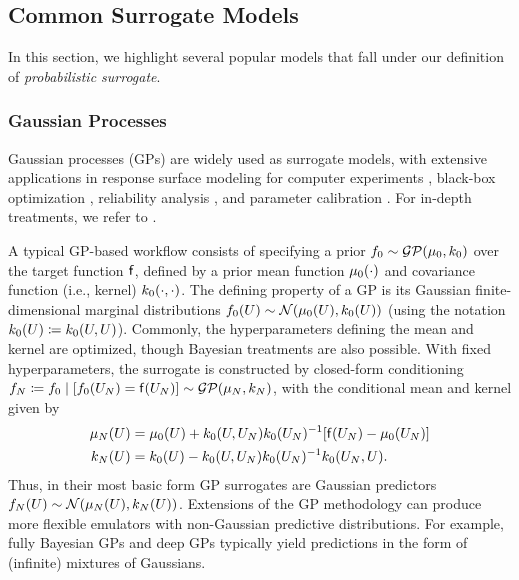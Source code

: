 \documentclass[12pt]{article}
\begin{document}
\subsection{Common Surrogate Models}
In this section, we highlight several popular models that fall under our definition of 
\textit{probabilistic surrogate}.

\subsubsection{Gaussian Processes}
Gaussian processes (GPs) are widely used as surrogate models, with extensive applications in 
response surface modeling for computer experiments 
\citep{design_analysis_computer_experiments,SanterCompExp}, 
black-box optimization \citep{reviewBayesOpt}, reliability 
analysis \citep{contourEstimation,cole2021entropybased}, and parameter 
calibration \citep{KOH,computerModelCalibrationReview}. For in-depth treatments, we refer to
\citet{gramacy2020surrogates,gpML,StuartTeck2}.

A typical GP-based workflow consists of specifying a prior $\targetEm[0] \sim \GP(\emMean[0], \emKer[0])$ 
over the target function $\target$, defined by a prior mean function $\emMean[0](\cdot)$ and 
covariance function (i.e., kernel) $\emKer[0](\cdot, \cdot)$. The 
defining property of a GP is its Gaussian finite-dimensional marginal distributions
$\targetEm[0](\ParBatch) \sim \Gaussian(\emMean[0](\ParBatch), \emKer[0](\ParBatch))$
(using the notation $\emKer[0](\ParBatch) \Def \emKer[0](\ParBatch, \ParBatch)$).
Commonly, the hyperparameters defining the mean and kernel are optimized, though Bayesian 
treatments are also possible. With fixed hyperparameters, the surrogate is constructed by 
closed-form conditioning 
$\targetEm \Def \targetEm[0] \given [\targetEm[0](\design) = \target(\design)] \sim \GP(\emMean, \emKer)$,
with the conditional mean and kernel given by
\begin{align}
\emMean(\ParBatch) 
&= \emMean[0](\ParBatch) + \emKer[0](\ParBatch, \design) \emKer[0](\design)^{-1}[\target(\design) - \emMean[0](\design)] \\
\emKer(\ParBatch) 
&= \emKer[0](\ParBatch) - \emKer[0](\ParBatch, \design) \emKer[0](\design)^{-1} \emKer[0](\design, \ParBatch).
\nonumber
\end{align}
Thus, in their most basic form GP surrogates are Gaussian predictors 
$\targetEm(\ParBatch) \sim \Gaussian(\emMean(\ParBatch), \emKer(\ParBatch))$. 
Extensions of the GP methodology
can produce more flexible emulators with non-Gaussian predictive distributions. For example, fully Bayesian 
GPs \citep{fullyBayesianGPs} and deep GPs \citep{deepGPVecchia,deepGPAL}
typically yield predictions in the form of (infinite) mixtures of Gaussians.
\end{document}
